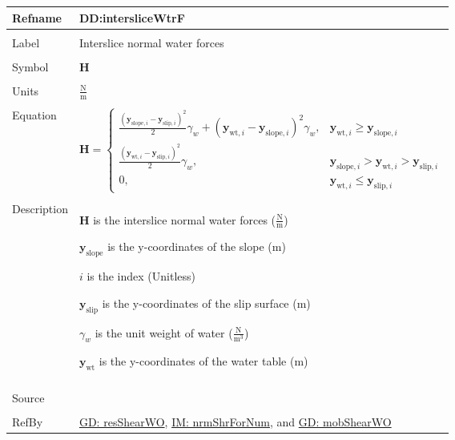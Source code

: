 \documentclass[12pt]{article}
\begin{document}
\noindent \begin{minipage}{\textwidth}
\begin{tabular}{>{\raggedright}p{}>{\raggedright\arraybackslash}p{}}
\toprule \textbf{Refname} & \textbf{DD:intersliceWtrF}
\label{DD:intersliceWtrF}
\\ \midrule \\
Label & Interslice normal water forces
\\ \midrule \\
Symbol & $\mathbf{H}$
\\ \midrule \\
Units & $\frac{\text{N}}{\text{m}}$
\\ \midrule \\
Equation & \begin{displaymath}
           \mathbf{H}=\begin{cases}
                      \frac{\left({\mathbf{y}_{\text{slope},i}}-{\mathbf{y}_{\text{slip},i}}\right)^{2}}{2} {γ_{w}}+\left({\mathbf{y}_{\text{wt},i}}-{\mathbf{y}_{\text{slope},i}}\right)^{2} {γ_{w}}, & {\mathbf{y}_{\text{wt},i}}\geq{}{\mathbf{y}_{\text{slope},i}}\\
\frac{\left({\mathbf{y}_{\text{wt},i}}-{\mathbf{y}_{\text{slip},i}}\right)^{2}}{2} {γ_{w}}, & {\mathbf{y}_{\text{slope},i}}>{\mathbf{y}_{\text{wt},i}}>{\mathbf{y}_{\text{slip},i}}\\
0, & {\mathbf{y}_{\text{wt},i}}\leq{}{\mathbf{y}_{\text{slip},i}}
                      \end{cases}
           \end{displaymath}
\\ \midrule \\
Description & \begin{symbDescription}
              \item{$\mathbf{H}$ is the interslice normal water forces ($\frac{\text{N}}{\text{m}}$)}
              \item{${\mathbf{y}_{\text{slope}}}$ is the y-coordinates of the slope (m)}
              \item{$i$ is the index (Unitless)}
              \item{${\mathbf{y}_{\text{slip}}}$ is the y-coordinates of the slip surface (m)}
              \item{${γ_{w}}$ is the unit weight of water ($\frac{\text{N}}{\text{m}^{3}}$)}
              \item{${\mathbf{y}_{\text{wt}}}$ is the y-coordinates of the water table (m)}
              \end{symbDescription}
\\ \midrule \\
Source & \cite{fredlund1977}
\\ \midrule \\
RefBy & \hyperref[GD:resShearWO]{GD: resShearWO}, \hyperref[IM:nrmShrForNum]{IM: nrmShrForNum}, and \hyperref[GD:mobShearWO]{GD: mobShearWO}
\\ \bottomrule
\end{tabular}
\end{minipage}
\par~
\end{document}
